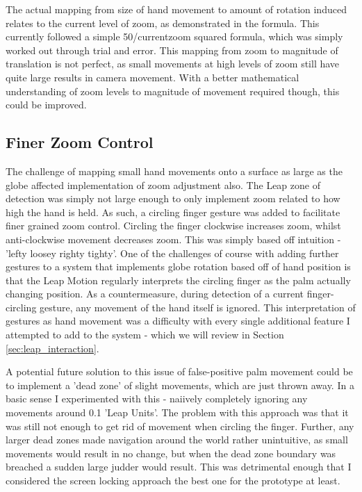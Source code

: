 \documentclass{sigplanconf}
\begin{document}
The actual mapping from size of hand movement to amount of rotation induced relates to the current level of zoom, as demonstrated in the formula. This currently followed a simple 50/currentzoom squared formula, which was simply worked out through trial and error. This mapping from zoom to magnitude of translation is not perfect, as small movements at high levels of zoom still have quite large results in camera movement. With a better mathematical understanding of zoom levels to magnitude of movement required though, this could be improved. 

\subsection{Finer Zoom Control}

The challenge of mapping small hand movements onto a surface as large as the globe affected implementation of zoom adjustment also. The Leap zone of detection was simply not large enough to only implement zoom related to how high the hand is held. As such, a circling finger gesture was added to facilitate finer grained zoom control. Circling the finger clockwise increases zoom, whilst anti-clockwise movement decreases zoom. This was simply based off intuition - 'lefty loosey righty tighty'. One of the challenges of course with adding further gestures to a system that implements globe rotation based off of hand position is that the Leap Motion regularly interprets the circling finger as the palm actually changing position. As a countermeasure, during detection of a current finger-circling gesture, any movement of the hand itself is ignored. This interpretation of gestures as hand movement was a difficulty with every single additional feature I attempted to add to the system - which we will review in Section \ref{sec:leap_interaction}.

A potential future solution to this issue of false-positive palm movement could be to implement a 'dead zone' of slight movements, which are just thrown away. In a basic sense I experimented with this - naiively completely ignoring any movements around 0.1 'Leap Units'. The problem with this approach was that it was still not enough to get rid of movement when circling the finger. Further, any larger dead zones made navigation around the world rather unintuitive, as small movements would result in no change, but when the dead zone boundary was breached a sudden large judder would result. This was detrimental enough that I considered the screen locking approach the best one for the prototype at least.
\end{document}
